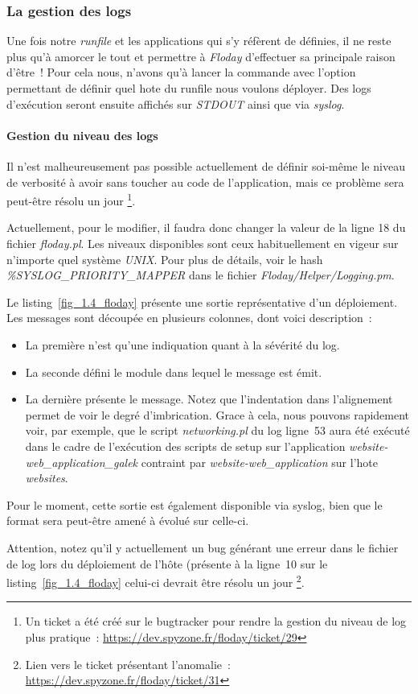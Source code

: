 \subsubsection{La gestion des logs}

Une fois notre \emph{runfile} et les applications qui s'y réfèrent de définies, il ne reste plus qu'à amorcer le tout et permettre à \emph{Floday} d'effectuer sa principale raison d'être~!
Pour cela nous, n'avons qu'à lancer la commande  avec l'option  permettant de définir quel \gls{hote} du runfile nous voulons déployer.
Des logs d'exécution seront ensuite affichés sur \emph{STDOUT} ainsi que via \emph{syslog}.

\paragraph{Gestion du niveau des logs}
Il n'est malheureusement pas possible actuellement de définir soi-même le niveau de verbosité à avoir sans toucher au code de l'application, mais ce problème sera peut-être résolu un jour%
\footnote{Un ticket a été créé sur le bugtracker pour rendre la gestion du niveau de log plus pratique~: \url{https://dev.spyzone.fr/floday/ticket/29}}.

Actuellement, pour le modifier, il faudra donc changer la valeur de la ligne 18 du fichier \emph{floday.pl}.
Les niveaux disponibles sont ceux habituellement en vigeur sur n'importe quel système \emph{UNIX}.
Pour plus de détails, voir le hash \emph{\%SYSLOG\_PRIORITY\_MAPPER} dans le fichier \emph{Floday/Helper/Logging.pm}.



Le listing~\ref{fig_1.4_floday} présente une sortie représentative d'un déploiement.
Les messages sont découpée en plusieurs colonnes, dont voici description~:
\begin{itemize}
	\item La première n'est qu'une indiquation quant à la sévérité du log.
	\item La seconde défini le module dans lequel le message est émit.
	\item La dernière présente le message. Notez que l'indentation dans l'alignement permet de voir le degré d'imbrication. Grace à cela, nous pouvons rapidement voir, par exemple, que le script \emph{networking.pl} du log ligne~53 aura été exécuté dans le cadre de l'exécution des scripts de setup sur l'\gls{application} \emph{website-web\_application\_galek} contraint par \emph{website-web\_application} sur l'\gls{hote} \emph{websites}.
\end{itemize}

Pour le moment, cette sortie est également disponible via syslog, bien que le format sera peut-être amené à évolué sur celle-ci.

Attention, notez qu'il y actuellement un bug générant une erreur dans le fichier de log lors du déploiement de l'hôte (présente à la ligne~10 sur le listing~\ref{fig_1.4_floday} celui-ci devrait être résolu un jour%
\footnote{Lien vers le ticket présentant l'anomalie~: \url{https://dev.spyzone.fr/floday/ticket/31}}.
